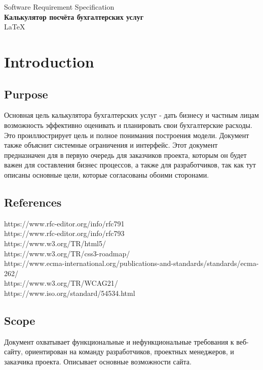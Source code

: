 \documentclass{article}
\begin{document}
\begin{center}
    \LARGE
    Software Requirement Specification\\
    \textbf{Калькулятор посчёта бухгалтерских услуг}\\
    \LaTeX
\end{center}
\newpage

\tableofcontents
\newpage

\section{Introduction}

\subsection{Purpose}
Основная цель калькулятора бухгалтерских услуг - дать бизнесу и частным лицам 
возможность эффективно оценивать и планировать свои бухгалтерские расходы.
Это проиллюстрирует цель и полное понимания построения модели. Документ также объяснит системные ограничения и интерфейс. Этот документ предназначен для в первую очередь для заказчиков проекта, которым он будет важен для составления бизнес процессов, а также для разработчиков, так как тут описаны основные цели, которые согласованы обоими сторонами.


\subsection{References}
https://www.rfc-editor.org/info/rfc791\\
https://www.rfc-editor.org/info/rfc793\\
https://www.w3.org/TR/html5/\\
https://www.w3.org/TR/css3-roadmap/\\
https://www.ecma-international.org/publications-and-standards/standards/ecma-262/\\
https://www.w3.org/TR/WCAG21/\\
https://www.iso.org/standard/54534.html\\

\subsection{Scope}
Документ охватывает функциональные и нефункциональные требования к веб-сайту, ориентирован на команду разработчиков, 
проектных менеджеров, и заказчика проекта. Описывает основные возможности сайта.
\end{document}
